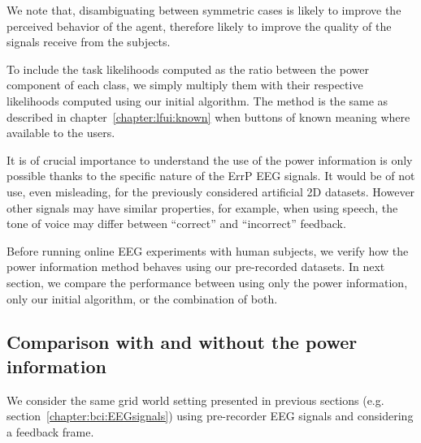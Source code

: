 We note that, disambiguating between symmetric cases is likely to improve the perceived behavior of the agent, therefore likely to improve the quality of the signals receive from the subjects. 




To include the task likelihoods computed as the ratio between the power component of each class, we simply multiply them with their respective likelihoods computed using our initial algorithm. The method is the same as described in chapter~\ref{chapter:lfui:known} when buttons of known meaning where available to the users.




It is of crucial importance to understand the use of the power information is only possible thanks to the specific nature of the ErrP EEG signals. It would be of not use, even misleading, for the previously considered artificial 2D datasets. However other signals may have similar properties, for example, when using speech, the tone of voice may differ between ``correct'' and ``incorrect'' feedback.

Before running online EEG experiments with human subjects, we verify how the power information method behaves using our pre-recorded datasets. In next section, we compare the performance between using only the power information, only our initial algorithm, or the combination of both.

\subsection{Comparison with and without the power information}

We consider the same grid world setting presented in previous sections (e.g. section~\ref{chapter:bci:EEGsignals}) using pre-recorder EEG signals and considering a feedback frame.


